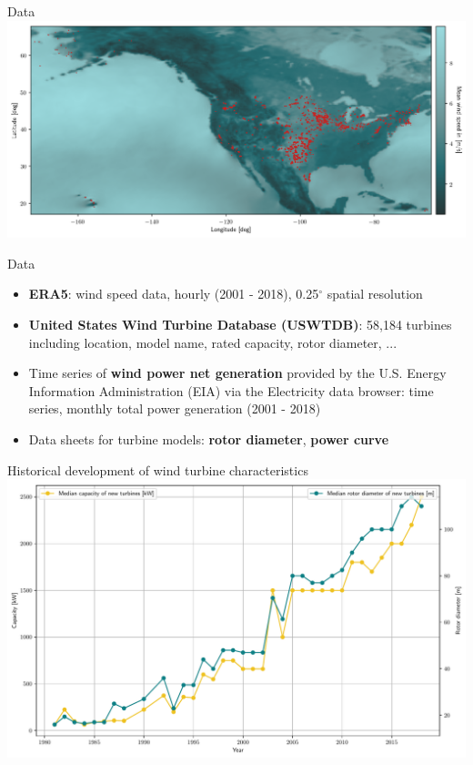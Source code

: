 \documentclass[color=usenames,dvipsnames]{beamer}
\begin{document}
    \begin{frame}{Data}
        \includegraphics[width=\textwidth]{../../figures/mean_wind_speed_and_turbines.png}
    \end{frame}

    \begin{frame}{Data}
        \begin{itemize}
            \item \textbf{ERA5}: wind speed data, hourly (2001 - 2018),
                0.25$^\circ$ spatial resolution\pause
            \item \textbf{United States Wind Turbine Database (USWTDB)}:
                58,184 turbines including location, model name, rated capacity,
                rotor diameter, ...\pause
            \item Time series of \textbf{wind power net generation} provided by
                the U.S. Energy Information Administration (EIA) via the
                Electricity data browser: time series, monthly total power
                generation (2001 - 2018)\pause
            \item Data sheets for turbine models:
                \textbf{rotor diameter}, \textbf{power curve}
        \end{itemize}
    \end{frame}

    \begin{frame}{Historical development of wind turbine characteristics}
        \includegraphics[width=\textwidth]{../../figures/history_turbines.pdf}
    \end{frame}
\end{document}

